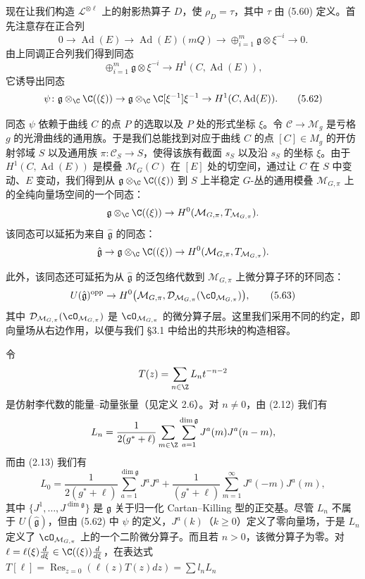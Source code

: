 

现在让我们构造 $\mathcal L^{\otimes\ell}$ 上的射影热算子 $D$，使 $\rho_D=\tau$，其中 $\tau$ 由 (5.60) 定义。首先注意存在正合列
\[
 0\to\operatorname{Ad}(E)\to\operatorname{Ad}(E)(mQ)\to\oplus_{i=1}^m\mathfrak g\otimes\xi^{-i}\to0.
\]
由上同调正合列我们得到同态
\[
 \oplus_{i=1}^m\mathfrak g\otimes\xi^{-i}\to H^1(C,\operatorname{Ad}(E)),
\]
它诱导出同态
\begin{equation}
 \psi\colon\mathfrak g\otimes_\C\C((\xi))\to\mathfrak g\otimes_\C\C[\xi^{-1}]\xi^{-1}\to H^1(C,\operatorname{Ad}(E)). \tag{5.62}
\end{equation}

同态 $\psi$ 依赖于曲线 $C$ 的点 $P$ 的选取以及 $P$ 处的形式坐标 $\xi$。令 $\mathcal C\to\mathcal M_g$ 是亏格 $g$ 的光滑曲线的通用族。于是我们总能找到对应于曲线 $C$ 的点 $[C]\in M_g$ 的开仿射邻域 $S$ 以及通用族 $\pi\colon\mathcal C_S\to S$，使得该族有截面 $s_S$ 以及沿 $s_S$ 的坐标 $\xi$。由于 $H^1(C,\operatorname{Ad}(E))$ 是模叠 $\mathcal M_G(C)$ 在 $[E]$ 处的切空间，通过让 $C$ 在 $S$ 中变动、$E$ 变动，我们得到从 $\mathfrak g\otimes_\C\C((\xi))$ 到 $S$ 上半稳定 $G$-丛的通用模叠 $\mathcal M_{G,\pi}$ 上的全纯向量场空间的一个同态：
\[
 \mathfrak g\otimes_\C\C((\xi))\to H^0(\mathcal M_{G,\pi},T_{\mathcal M_{G,\pi}}).
\]
该同态可以延拓为来自 $\hat{\mathfrak g}$ 的同态：
\[
 \hat{\mathfrak g}\to\mathfrak g\otimes_\C\C((\xi))\to H^0(\mathcal M_{G,\pi},T_{\mathcal M_{G,\pi}}).
\]


此外，该同态还可延拓为从 $\hat{\mathfrak g}$ 的泛包络代数到 $\mathcal M_{G,\pi}$ 上微分算子环的环同态：
\begin{equation}
 U(\hat{\mathfrak g})^{\mathrm{opp}}\to H^0\bigl(\mathcal M_{G,\pi},\mathcal D_{\mathcal M_{G,\pi}}(\cO_{\mathcal M_{G,\pi}})\bigr), \tag{5.63}
\end{equation}
其中 $\mathcal D_{\mathcal M_{G,\pi}}(\cO_{\mathcal M_{G,\pi}})$ 是 $\cO_{\mathcal M_{G,\pi}}$ 的微分算子层。这里我们采用不同的约定，即向量场从右边作用，以便与我们 §3.1 中给出的共形块的构造相容。

令
\[
 T(z)=\sum_{n\in\Z}L_n t^{-n-2}
\]
是仿射李代数的能量–动量张量（见定义 2.6）。对 $n\ne0$，由 (2.12) 我们有
\[
 L_n=\frac{1}{2(g^*+\ell)}\sum_{m\in\Z}\sum_{a=1}^{\dim\mathfrak g}J^a(m)J^a(n-m),
\]
而由 (2.13) 我们有
\[
 L_0=\frac{1}{2(g^*+\ell)}\sum_{a=1}^{\dim\mathfrak g}J^aJ^a+\frac{1}{(g^*+\ell)}\sum_{m=1}^{\infty}J^a(-m)J^a(m),
\]
其中 $\{J^1,\dots,J^{\dim\mathfrak g}\}$ 是 $\mathfrak g$ 关于归一化 Cartan–Killing 型的正交基。尽管 $L_n$ 不属于 $U(\hat{\mathfrak g})$，但由 (5.62) 中 $\psi$ 的定义，$J^a(k)$（$k\ge0$）定义了零向量场，于是 $L_n$ 定义了 $\cO_{\mathcal M_{G,\pi}}$ 上的一个二阶微分算子。而且若 $n>0$，该微分算子为零。对 $\ell=\ell(\xi)\frac{d}{d\xi}\in\C((\xi))\frac{d}{d\xi}$，在表达式 $T[\ell]=\operatorname*{Res}_{z=0}(\ell(z)T(z)dz)=\sum l_n L_n$

